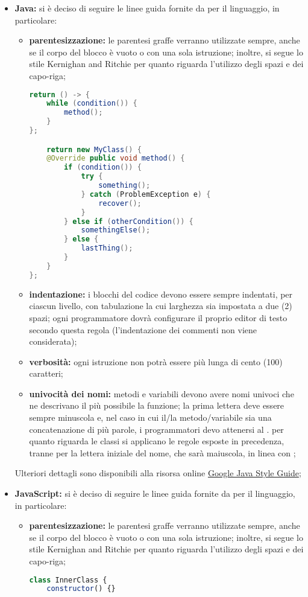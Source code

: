 					\begin{itemize}
						\item \textbf{Java:} si è deciso di seguire le linee guida fornite da  per il linguaggio, in particolare:
							\begin{itemize}
								\item \textbf{parentesizzazione:} le parentesi graffe verranno utilizzate sempre, anche se il corpo del blocco è vuoto o con una sola istruzione; inoltre, si segue lo stile Kernighan and Ritchie per quanto riguarda l'utilizzo degli spazi e dei capo-riga;
									\begin{lstlisting}[language=java,captionpos=b,caption={Esempio per la sintassi Java}]
return () -> {
	while (condition()) {
		method();
	}
};

	return new MyClass() {
	@Override public void method() {
		if (condition()) {
			try {
				something();
			} catch (ProblemException e) {
				recover();
			}
		} else if (otherCondition()) {
			somethingElse();
		} else {
			lastThing();
		}
	}
};
									\end{lstlisting}
								\item \textbf{indentazione:} i blocchi del codice devono essere sempre indentati, per ciascun livello, con tabulazione la cui larghezza sia impostata a due (2) spazi; ogni programmatore dovrà configurare il proprio editor di testo secondo questa regola (l'indentazione dei commenti non viene considerata);
								\item \textbf{verbosità:} ogni istruzione non potrà essere più lunga di cento (100) caratteri;
								\item \textbf{univocità dei nomi:} metodi e variabili devono avere nomi univoci che ne descrivano il più possibile la funzione; la prima lettera deve essere sempre minuscola e, nel caso in cui il/la metodo/variabile sia una concatenazione di più parole, i programmatori devo attenersi al . per quanto riguarda le classi si applicano le regole esposte in precedenza, tranne per la lettera iniziale del nome, che sarà maiuscola, in linea con ;

							\end{itemize}
							Ulteriori dettagli sono disponibili alla risorsa online \href{https://google.github.io/styleguide/javaguide.html}{Google Java Style Guide};
						\item \textbf{JavaScript:} si è deciso di seguire le linee guida fornite da  per il linguaggio, in particolare:
							\begin{itemize}
								\item \textbf{parentesizzazione:} le parentesi graffe verranno utilizzate sempre, anche se il corpo del blocco è vuoto o con una sola istruzione; inoltre, si segue lo stile Kernighan and Ritchie per quanto riguarda l'utilizzo degli spazi e dei capo-riga;
								\begin{lstlisting}[language=JavaScript,captionpos=b,caption={Esempio per la sintassi JavaScript}]
class InnerClass {
	constructor() {}


\end{lstlisting}
\end{itemize}
\end{itemize}
